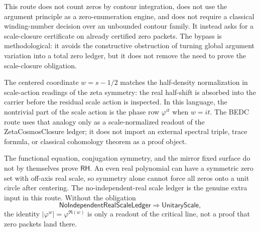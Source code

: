 \begin{principle}
\label{prin:rh-unitary-scale-closure-argument-principle-bypass}
This route does not count zeros by contour integration, does not use the
argument principle as a zero-enumeration engine, and does not require a
classical winding-number decision over an unbounded contour family. It
instead asks for a scale-closure certificate on already certified zero
packets. The bypass is methodological: it avoids the constructive
obstruction of turning global argument variation into a total zero ledger,
but it does not remove the need to prove the scale-closure obligation.
\end{principle}

\begin{remark}
\label{rem:rh-unitary-scale-closure-half-density}
The centered coordinate $w=s-1/2$ matches the half-density normalization
in scale-action readings of the zeta symmetry: the real half-shift is
absorbed into the carrier before the residual scale action is inspected.
In this language, the nontrivial part of the scale action is the phase row
$\varphi^{it}$ when $w=it$. The BEDC route uses that analogy only as a
scale-normalized readout of the ZetaCosmosClosure ledger; it does not
import an external spectral triple, trace formula, or classical
cohomology theorem as a proof object.
\end{remark}

\begin{principle}
\label{prin:rh-unitary-scale-closure-symmetry-no-go}
The functional equation, conjugation symmetry, and the mirror fixed surface
do not by themselves prove $\mathsf{RH}$. An even real polynomial can have
a symmetric zero set with off-axis real scale, so symmetry alone cannot
force all zeros onto a unit circle after centering. The no-independent-real
scale ledger is the genuine extra input in this route. Without the
obligation
$$
\mathsf{NoIndependentRealScaleLedger}
\Longrightarrow
\mathsf{UnitaryScale},
$$
the identity $|\varphi^w|=\varphi^{\Re(w)}$ is only a readout of the
critical line, not a proof that zero packets land there.
\end{principle}

